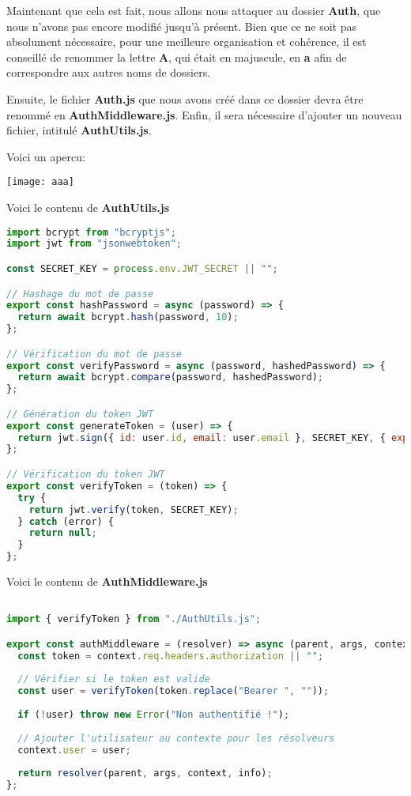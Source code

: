 \documentclass{article}
\begin{document}
    Maintenant que cela est fait, nous allons nous attaquer au dossier \textbf{Auth}, que nous n'avons pas encore modifié jusqu'à présent. Bien que ce ne soit pas absolument nécessaire, pour une meilleure organisation et cohérence, il est conseillé de renommer la lettre \textbf{A}, qui était en majuscule, en \textbf{a} afin de correspondre aux autres noms de dossiers.

Ensuite, le fichier \textbf{Auth.js} que nous avons créé dans ce dossier devra être renommé en \textbf{AuthMiddleware.js}. Enfin, il sera nécessaire d'ajouter un nouveau fichier, intitulé \textbf{AuthUtils.js}.

Voici un apercu:
   \begin{center} 
    \texttt{[image: aaa]} 
\end{center}

Voici le contenu de  \textbf{AuthUtils.js}


\begin{lstlisting}[language=JavaScript]
import bcrypt from "bcryptjs";
import jwt from "jsonwebtoken";

const SECRET_KEY = process.env.JWT_SECRET || "";

// Hashage du mot de passe
export const hashPassword = async (password) => {
  return await bcrypt.hash(password, 10);
};

// Vérification du mot de passe
export const verifyPassword = async (password, hashedPassword) => {
  return await bcrypt.compare(password, hashedPassword);
};

// Génération du token JWT
export const generateToken = (user) => {
  return jwt.sign({ id: user.id, email: user.email }, SECRET_KEY, { expiresIn: "1h" });
};

// Vérification du token JWT
export const verifyToken = (token) => {
  try {
    return jwt.verify(token, SECRET_KEY);
  } catch (error) {
    return null;
  }
};
    \end{lstlisting}
    Voici le contenu de  \textbf{AuthMiddleware.js}
    
    \begin{lstlisting}[language=JavaScript]

import { verifyToken } from "./AuthUtils.js";

export const authMiddleware = (resolver) => async (parent, args, context, info) => {
  const token = context.req.headers.authorization || "";
  
  // Vérifier si le token est valide
  const user = verifyToken(token.replace("Bearer ", ""));
  
  if (!user) throw new Error("Non authentifié !");
  
  // Ajouter l'utilisateur au contexte pour les résolveurs
  context.user = user;
  
  return resolver(parent, args, context, info);
};

 \end{lstlisting}
\end{document}

